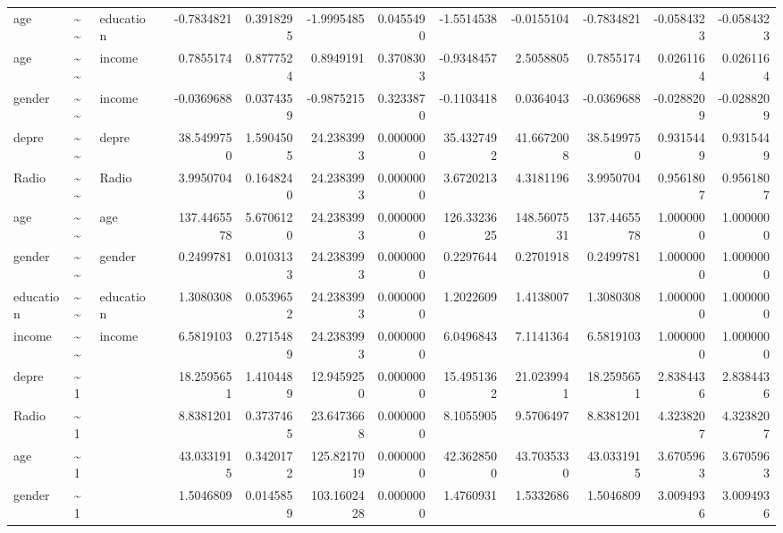 \documentclass[
]{article}
\begin{document}
\begin{table}[!h]
\begin{tabular}[t]{llllrrrrrrrrr}
age & \textasciitilde{}\textasciitilde{} & education &  & -0.7834821 & 0.3918295 & -1.9995485 & 0.0455490 & -1.5514538 & -0.0155104 & -0.7834821 & -0.0584323 & -0.0584323\\
age & \textasciitilde{}\textasciitilde{} & income &  & 0.7855174 & 0.8777524 & 0.8949191 & 0.3708303 & -0.9348457 & 2.5058805 & 0.7855174 & 0.0261164 & 0.0261164\\
gender & \textasciitilde{}\textasciitilde{} & income &  & -0.0369688 & 0.0374359 & -0.9875215 & 0.3233870 & -0.1103418 & 0.0364043 & -0.0369688 & -0.0288209 & -0.0288209\\
\addlinespace
depre & \textasciitilde{}\textasciitilde{} & depre &  & 38.5499750 & 1.5904505 & 24.2383993 & 0.0000000 & 35.4327492 & 41.6672008 & 38.5499750 & 0.9315449 & 0.9315449\\
Radio & \textasciitilde{}\textasciitilde{} & Radio &  & 3.9950704 & 0.1648240 & 24.2383993 & 0.0000000 & 3.6720213 & 4.3181196 & 3.9950704 & 0.9561807 & 0.9561807\\
age & \textasciitilde{}\textasciitilde{} & age &  & 137.4465578 & 5.6706120 & 24.2383993 & 0.0000000 & 126.3323625 & 148.5607531 & 137.4465578 & 1.0000000 & 1.0000000\\
gender & \textasciitilde{}\textasciitilde{} & gender &  & 0.2499781 & 0.0103133 & 24.2383993 & 0.0000000 & 0.2297644 & 0.2701918 & 0.2499781 & 1.0000000 & 1.0000000\\
education & \textasciitilde{}\textasciitilde{} & education &  & 1.3080308 & 0.0539652 & 24.2383993 & 0.0000000 & 1.2022609 & 1.4138007 & 1.3080308 & 1.0000000 & 1.0000000\\
\addlinespace
income & \textasciitilde{}\textasciitilde{} & income &  & 6.5819103 & 0.2715489 & 24.2383993 & 0.0000000 & 6.0496843 & 7.1141364 & 6.5819103 & 1.0000000 & 1.0000000\\
depre & \textasciitilde{}1 &  &  & 18.2595651 & 1.4104489 & 12.9459250 & 0.0000000 & 15.4951362 & 21.0239941 & 18.2595651 & 2.8384436 & 2.8384436\\
Radio & \textasciitilde{}1 &  &  & 8.8381201 & 0.3737465 & 23.6473668 & 0.0000000 & 8.1055905 & 9.5706497 & 8.8381201 & 4.3238207 & 4.3238207\\
age & \textasciitilde{}1 &  &  & 43.0331915 & 0.3420172 & 125.8217019 & 0.0000000 & 42.3628500 & 43.7035330 & 43.0331915 & 3.6705963 & 3.6705963\\
gender & \textasciitilde{}1 &  &  & 1.5046809 & 0.0145859 & 103.1602428 & 0.0000000 & 1.4760931 & 1.5332686 & 1.5046809 & 3.0094936 & 3.0094936\\

\end{tabular}
\end{table}
\end{document}
